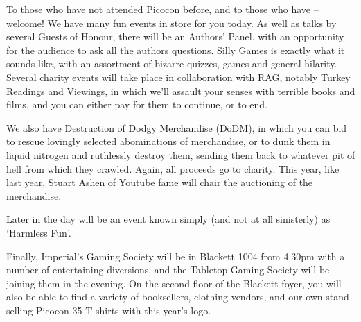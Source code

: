 To those who have not attended Picocon before, and to those who have – welcome! We have many fun events in store for you today. As well as talks by several Guests of Honour, there will be an Authors' Panel, with an opportunity for the audience to ask all the authors questions. Silly Games is exactly what it sounds like, with an assortment of bizarre quizzes, games and general hilarity. Several charity events will take place in collaboration with RAG, notably Turkey Readings and Viewings, in which we'll assault your senses with terrible books and films, and you can either pay for them to continue, or to end. 

We also have Destruction of Dodgy Merchandise (DoDM), in which you can bid to rescue lovingly selected abominations of merchandise, or to dunk them in liquid nitrogen and ruthlessly destroy them, sending them back to whatever pit of hell from which they crawled. Again, all proceeds go to charity. This year, like last year, Stuart Ashen of Youtube fame will chair the auctioning of the merchandise.

Later in the day will be an event known simply (and not at all sinisterly) as `Harmless Fun'.

Finally, Imperial's Gaming Society will be in Blackett 1004 from 4.30pm with a number of entertaining diversions, and the Tabletop Gaming Society will be joining them in the evening. On the second floor of the Blackett foyer, you will also be able to find a variety of booksellers, clothing vendors, and our own stand selling Picocon 35 T-shirts with this year's logo.